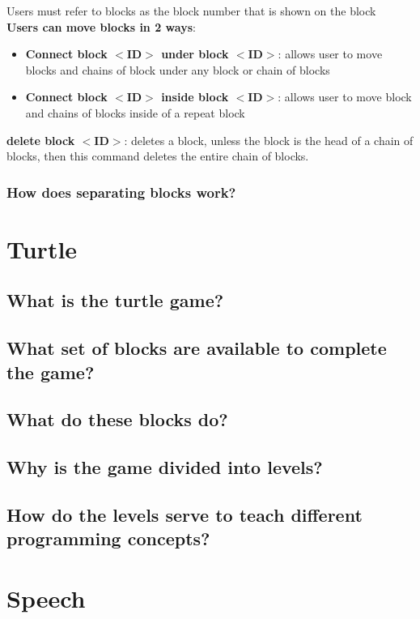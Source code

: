 \documentclass[]{article}
\begin{document}
Users must refer to blocks as the block number that is shown on the block\\
\textbf{Users can move blocks in 2 ways}:
\begin{itemize}
\item \textbf{Connect block $<$ID$>$ under block $<$ID$>$}: allows user to move blocks and chains of block under any block or chain of blocks
\item \textbf{Connect block $<$ID$>$ inside block $<$ID$>$}: allows user to move block and chains of blocks inside of a repeat block
\end{itemize}
\textbf{delete block $<$ID$>$}: deletes a block,  unless the block is the head of a chain of blocks, then this command deletes the entire chain of blocks. 
\subsubsection{How does separating blocks work?}

\section{Turtle}

\subsection{What is the turtle game?}

\subsection{What set of blocks are available to complete the game?}

\subsection{What do these blocks do?}

\subsection{Why is the game divided into levels?}

\subsection{How do the levels serve to teach different programming concepts?}


\section{Speech}
\end{document}
